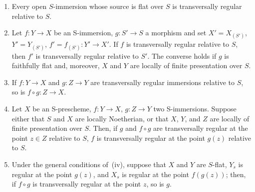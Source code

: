 \begin{proposition}[19.2.7]
\label{IV.19.2.7}
\medskip\noindent
\begin{enumerate}[label=\textup{(\roman*)}]
  \item Every open $S$-immersion whose source is flat over $S$ is transversally regular relative to $S$.
  \item Let $f:Y\to X$ be an S-immersion, $g:S'\to S$ a morphism and set $X'=X_{(S')}$, $Y'=Y_{(S')}$, $f'=f_{(S')}:Y'\to X'$.
If $f$ is transversally regular relative to $S$, then $f'$ is transversally regular relative to $S'$. The converse holds if $g$ is faithfully flat and, moreover, $X$ and $Y$ are locally of finite presentation over $S$.
  \item If $f:Y\to X$ and $g:Z\to Y$ are transversally regular immersions relative to $S$, so is $f\circ g:Z\to X$.
  \item Let $X$ be an S-prescheme, $f:Y\to X$, $g:Z\to Y$ two S-immersions.
Suppose either that $S$ and $X$ are locally Noetherian, or that $X$, $Y$, and $Z$ are locally of finite presentation over $S$.
Then, if $g$ and $f\circ g$ are transversally regular at the point $z\in Z$ relative to $S$, $f$ is transversally regular at the point $g(z)$ relative to $S$.
  \item Under the general conditions of~\textup{(iv)}, suppose that $X$ and $Y$ are $S$-flat, $Y_s$ is regular at the point $g(z)$, and $X_s$ is regular at the point $f(g(z))$; then, if $f\circ g$ is transversally regular at the point $z$, so is $g$.
\end{enumerate}
\end{proposition}

